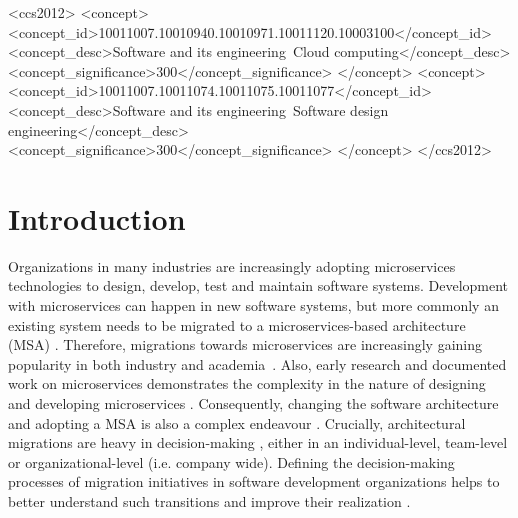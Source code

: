 \documentclass[sigconf,dvipsnames]{acmart}
\begin{document}
\begin{CCSXML}
<ccs2012>
   <concept>
       <concept_id>10011007.10010940.10010971.10011120.10003100</concept_id>
       <concept_desc>Software and its engineering~Cloud computing</concept_desc>
       <concept_significance>300</concept_significance>
       </concept>
   <concept>
       <concept_id>10011007.10011074.10011075.10011077</concept_id>
       <concept_desc>Software and its engineering~Software design engineering</concept_desc>
       <concept_significance>300</concept_significance>
       </concept>
 </ccs2012>
\end{CCSXML}




\maketitle
\pagestyle{plain} %

\section{Introduction}

Organizations in many industries are increasingly adopting microservices technologies to design, develop, test and maintain software systems.
Development with microservices can happen in new software systems, but more commonly an existing system needs to be migrated to a microservices-based architecture (MSA) \cite{Balalaie2018}. 
Therefore, migrations towards microservices are increasingly gaining popularity in both industry and academia~\cite{Hassan2020, SOLDANI2018215}.
Also, early research and documented work on microservices demonstrates the complexity in the nature of designing and developing microservices 
\cite{Zimmermann2017, newman2015building}.
Consequently, changing the software architecture and adopting a MSA is also a complex endeavour \cite{Fritzsch2019}. 
Crucially, architectural migrations are heavy in decision-making \cite{Carvalho2019}, either in an individual-level, team-level or organizational-level (i.e. company wide). Defining the decision-making processes of migration initiatives in software development organizations helps to better understand such transitions and improve their realization \cite{Badampudi2018, AUER2021106600}.
\end{document}
